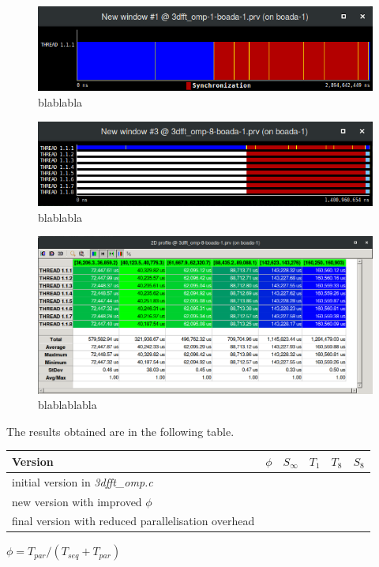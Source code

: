 \documentclass[12]{article}
\begin{document}
\begin{figure}[H]
\centering  \includegraphics[width=\linewidth]{images/TempsVersio1Processador1.png}
  \caption{blablabla}
  \label{fig:tempsv1Proc1}
\end{figure}




\begin{figure}[H]
\centering  \includegraphics[width=\linewidth]{images/TempsVersio1Processador8.png}
  \caption{blablabla}
  \label{fig:tempsParalv1Proc8}
\end{figure}



\begin{figure}[H]
\centering  \includegraphics[width=\linewidth]{images/TempsParalVersio1Processador8.png}
  \caption{blablablabla}
  \label{fig:tempsParalv1Proc8}
\end{figure}


The results obtained are in the following table.
\begin{table}[H]
\begin{tabular}{|l|l|l|l|l|l|}
\hline \textbf{Version} & $\phi $ & $S_\infty$ & $T_1$ & $T_8$ & $S_8$ \\ \hline
initial version in \textit{3dfft\_omp.c} & & & & & \\ \hline
new version with improved $\phi$ & & & & & \\ \hline
final version with reduced parallelisation overhead & & & & &  \\ \hline

\end{tabular}
\begin{center}
$\phi = T_{par} / (T_{seq} + T_{par}) $
\end{center}
\end{table}

\end{document}
